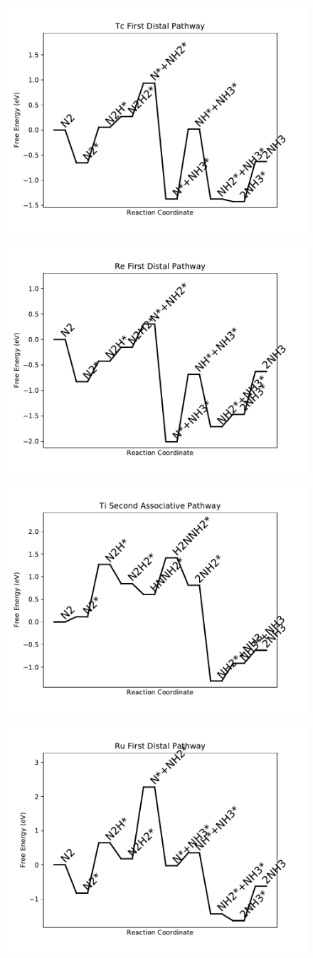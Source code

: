 \begin{figure}
\includegraphics[width=0.5\linewidth]{data/plots/Tc_distal_1.pdf}
\label{fig:Tc_distal_1}
\end{figure}

\begin{figure}
\includegraphics[width=0.5\linewidth]{data/plots/Re_distal_1.pdf}
\label{fig:Re_distal_1}
\end{figure}

\begin{figure}
\includegraphics[width=0.5\linewidth]{data/plots/Ti_associative_2.pdf}
\label{fig:Ti_associative_2}
\end{figure}

\begin{figure}
\includegraphics[width=0.5\linewidth]{data/plots/Ru_distal_1.pdf}
\label{fig:Ru_distal_1}
\end{figure}

